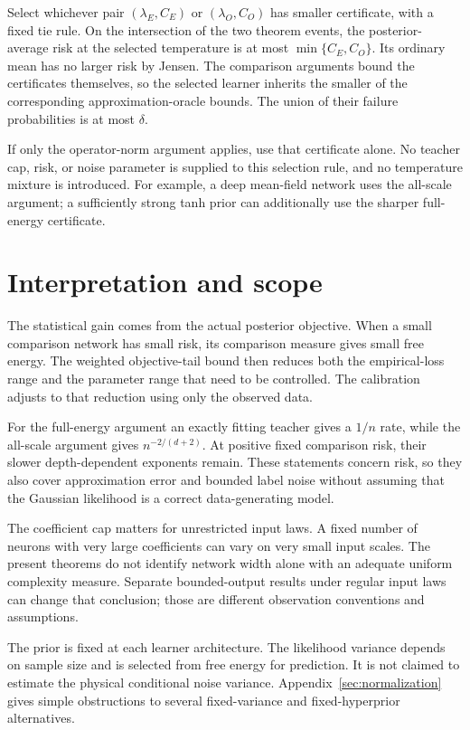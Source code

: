 \documentclass[11pt]{article}
\theoremstyle{definition}\newtheorem{definition}[theorem]{Definition}
\theoremstyle{remark}\newtheorem{remark}[theorem]{Remark}
\begin{document}
Select whichever pair $(\lambda_E,C_E)$ or $(\lambda_O,C_O)$ has smaller certificate, with a fixed tie rule. On the intersection of the two theorem events, the posterior-average risk at the selected temperature is at most $\min\{C_E,C_O\}$. Its ordinary mean has no larger risk by Jensen. The comparison arguments bound the certificates themselves, so the selected learner inherits the smaller of the corresponding approximation-oracle bounds. The union of their failure probabilities is at most $\delta$.

If only the operator-norm argument applies, use that certificate alone. No teacher cap, risk, or noise parameter is supplied to this selection rule, and no temperature mixture is introduced. For example, a deep mean-field network uses the all-scale argument; a sufficiently strong tanh prior can additionally use the sharper full-energy certificate.

\section{Interpretation and scope}
The statistical gain comes from the actual posterior objective. When a small comparison network has small risk, its comparison measure gives small free energy. The weighted objective-tail bound then reduces both the empirical-loss range and the parameter range that need to be controlled. The calibration adjusts to that reduction using only the observed data.

For the full-energy argument an exactly fitting teacher gives a $1/n$ rate, while the all-scale argument gives $n^{-2/(d+2)}$. At positive fixed comparison risk, their slower depth-dependent exponents remain. These statements concern risk, so they also cover approximation error and bounded label noise without assuming that the Gaussian likelihood is a correct data-generating model.

The coefficient cap matters for unrestricted input laws. A fixed number of neurons with very large coefficients can vary on very small input scales. The present theorems do not identify network width alone with an adequate uniform complexity measure. Separate bounded-output results under regular input laws can change that conclusion; those are different observation conventions and assumptions.

The prior is fixed at each learner architecture. The likelihood variance depends on sample size and is selected from free energy for prediction. It is not claimed to estimate the physical conditional noise variance. Appendix~\ref{sec:normalization} gives simple obstructions to several fixed-variance and fixed-hyperprior alternatives.
\end{document}
